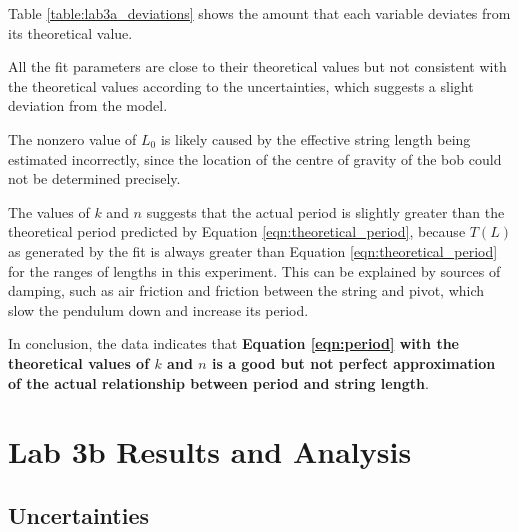 \documentclass[aps,twocolumn,secnumarabic,nobalancelastpage,amsmath,amssymb,nofootinbib,floatfix,letterpaper]{revtex4}
\begin{document}
Table \ref{table:lab3a_deviations} shows the amount that each variable deviates from its theoretical value.

All the fit parameters are close to their theoretical values but not consistent with the theoretical values according to
the uncertainties, which suggests a slight deviation from the model.

The nonzero value of \(L_0\) is likely caused by the effective string length being estimated incorrectly, since the
location of the centre of gravity of the bob could not be determined precisely.

The values of \(k\) and \(n\) suggests that the actual period is slightly greater than the theoretical period predicted
by Equation \ref{eqn:theoretical_period}, because \(T(L)\) as generated by the fit is always greater than Equation
\ref{eqn:theoretical_period} for the ranges of lengths in this experiment. This can be explained by sources of damping,
such as air friction and friction between the string and pivot, which slow the pendulum down and increase its period.

In conclusion, the data indicates that \textbf{Equation \ref{eqn:period} with the theoretical values of \(k\) and \(n\)
is a good but not perfect approximation of the actual relationship between period and string length}.


\section{Lab 3b Results and Analysis}

\subsection{Uncertainties}
\label{sec:lab3b_uncertainties}
\end{document}
